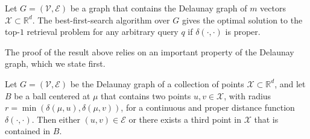 \begin{theorem}
    \label{theorem:graphs:delaunay}
    Let $G = (\mathcal{V}, \mathcal{E})$ be a graph that contains the Delaunay graph of $m$ vectors
    $\mathcal{X} \subset \mathbb{R}^d$.
    The best-first-search algorithm over $G$ gives the optimal solution to the top-$1$ retrieval problem
    for any arbitrary query $q$ if $\delta(\cdot, \cdot)$ is proper.
\end{theorem}

The proof of the result above relies on an important property of the Delaunay graph,
which we state first.

\begin{lemma}
\label{lemma:graphs:delaunay}
    Let $G = (\mathcal{V}, \mathcal{E})$ be the Delaunay graph of
    a collection of points $\mathcal{X} \subset \mathbb{R}^d$,
    and let $B$ be a ball centered at $\mu$ that contains two
    points $u, v \in \mathcal{X}$, with radius $r = \min (\delta(\mu, u), \delta(\mu, v))$,
    for a continuous and proper distance function $\delta(\cdot, \cdot)$.
    Then either $(u, v) \in \mathcal{E}$ or there exists a third point in $\mathcal{X}$
    that is contained in $B$.
\end{lemma}
